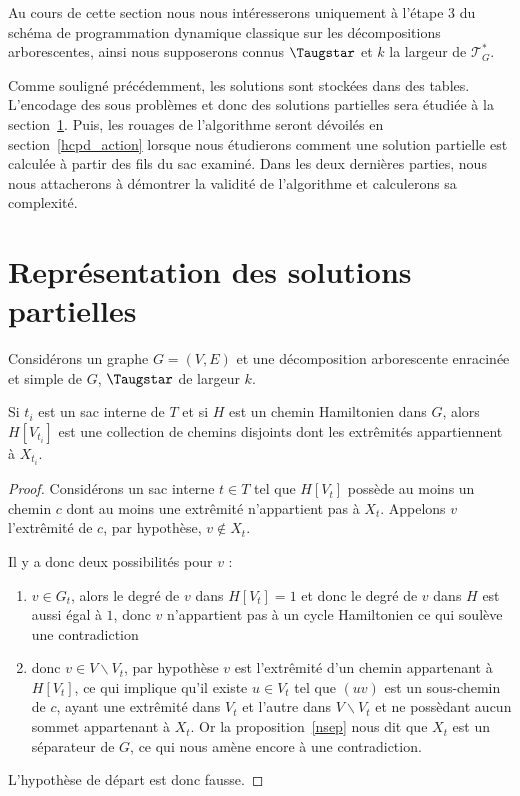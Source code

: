 
Au cours de cette section nous nous intéresserons uniquement à l'étape $3$ du schéma de programmation
dynamique classique sur les décompositions arborescentes, ainsi nous supposerons connus $\Taugstar$
et $k$ la largeur de $\mathcal{T}_G^*$.

Comme souligné précédemment, les solutions sont stockées dans des tables. L'encodage des sous
problèmes et donc des solutions partielles sera étudiée à la section~\ref{hcpd_table}. Puis, les
rouages de l'algorithme seront dévoilés en section~\ref{hcpd_action} lorsque nous étudierons comment
une solution partielle est calculée à partir des fils du sac examiné. Dans les deux dernières
parties, nous nous attacherons à démontrer la validité de l'algorithme et calculerons sa
complexité.

\section{Représentation des solutions partielles}
\label{hcpd_table}

Considérons un graphe $G=(V, E)$ et une décomposition arborescente enracinée et simple de $G$,
$\Taugstar$ de largeur $k$.
\begin{nlemma}
    Si $t_i$ est un sac interne de $T$ et si $H$ est un chemin Hamiltonien dans $G$, alors
    $H[V_{t_i}]$ est une collection de chemins disjoints dont les extrêmités appartiennent à
    $X_{t_i}$.
\end{nlemma}

\begin{proof}
    Considérons un sac interne $t \in T$ tel que $H[V_t]$ possède au moins un chemin $c$ dont au moins
    une extrêmité n'appartient pas à $X_t$. Appelons $v$ l'extrêmité de $c$, par
    hypothèse, $v \not \in X_t$.

    Il y a donc deux possibilités pour $v$ :
    \begin{enumerate}
        \item $v \in G_t$, alors le degré de $v$ dans $H[V_t] = 1$ et donc le degré de $v$ dans $H$
            est aussi égal à $1$, donc $v$ n'appartient pas à un cycle Hamiltonien ce qui soulève une
            contradiction
        \item donc $v \in V\backslash V_t$, par hypothèse $v$ est l'extrêmité d'un chemin appartenant à
            $H[V_t]$, ce qui implique qu'il existe $u \in V_t$ tel que $(uv)$ est un sous-chemin de
            $c$, ayant une extrêmité dans $V_t$ et l'autre dans $V\backslash V_t$ et ne possèdant aucun
            sommet appartenant à $X_t$. Or la proposition~\ref{nsep} nous dit que $X_t$ est un
            séparateur de $G$, ce qui nous amène encore à une contradiction.
    \end{enumerate}
    L'hypothèse de départ est donc fausse.
\end{proof}

